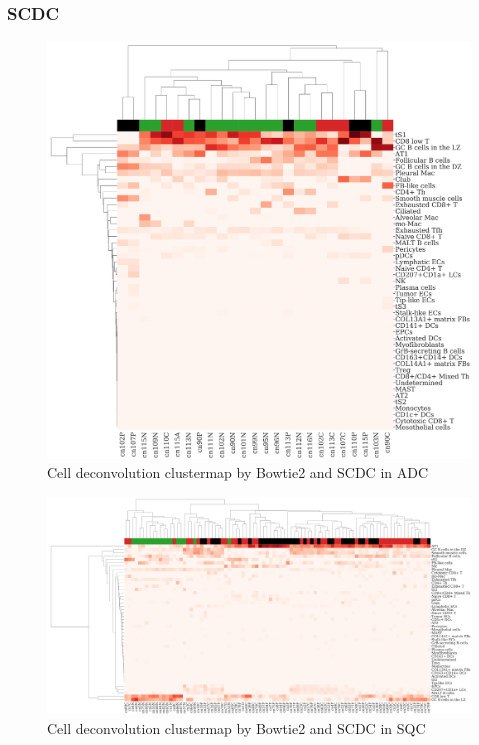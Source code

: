 \documentclass[a4paper]{article}
\begin{document}
            \subsubsection{SCDC}
                \begin{figure}[htbp]
                    \centering
                    \includegraphics[width=0.6 \linewidth]{figures/SCDC/clustermap/Bowtie2.ADC.cluster.pdf}
                    \caption{Cell deconvolution clustermap by Bowtie2 and SCDC in ADC}
                    \label{fig:Deconvolution-SCDC-Bowtie2-cluster-ADC}
                \end{figure}

                \begin{figure}[htbp]
                    \centering
                    \includegraphics[width=\linewidth]{figures/SCDC/clustermap/Bowtie2.SQC.cluster.pdf}
                    \caption{Cell deconvolution clustermap by Bowtie2 and SCDC in SQC}
                    \label{fig:Deconvolution-SCDC-Bowtie2-cluster-SQC}
                \end{figure}
\end{document}
